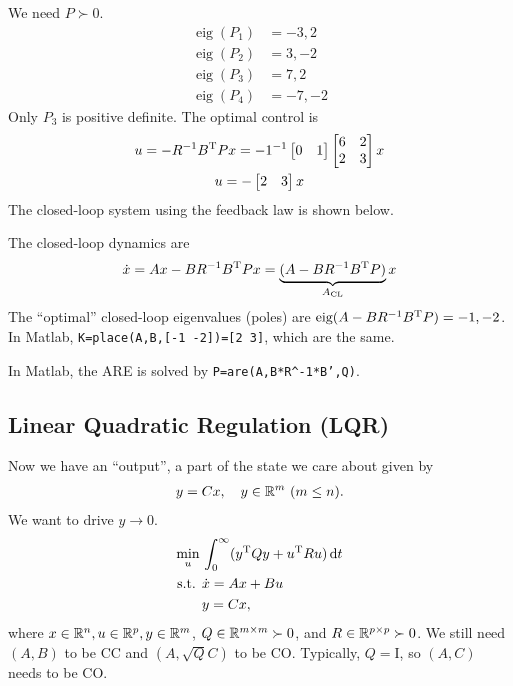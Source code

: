 We need $P\succ0$.
\begin{align}
  \mathop\text{eig}(P_1) &= -3,2 \\
  \mathop\text{eig}(P_2) &= 3,-2 \\
  \mathop\text{eig}(P_3) &= 7,2 \\
  \mathop\text{eig}(P_4) &= -7,-2
\end{align}
Only $P_3$ is positive definite. The optimal control is
\begin{gather}
  u = -R^{-1}B^\text{T} Px = -1^{-1} \begin{bmatrix}
    0 & 1
  \end{bmatrix} \begin{bmatrix}
    6 & 2 \\ 2 & 3
  \end{bmatrix} x \\
  u = - \begin{bmatrix}
    2 & 3
  \end{bmatrix} x
\end{gather}
The closed-loop system using the feedback law is shown below.
\begin{center}
\end{center}
The closed-loop dynamics are
\begin{gather}
  \dot x = Ax - BR^{-1}B^\text{T} Px = \underbrace{(A-BR^{-1}B^\text{T} P)}_{A_\text{CL}} x
\end{gather}
The ``optimal'' closed-loop eigenvalues (poles) are $\mathop\text{eig}(A-BR^{-1}B^\text{T} P)=-1,-2$. In Matlab, \texttt{K=place(A,B,[-1 -2])=[2 3]}, which are the same.

In Matlab, the ARE is solved by \texttt{P=are(A,B*R\^{}-1*B',Q)}.

\subsection{Linear Quadratic Regulation (LQR)}
Now we have an ``output'', a part of the state we care about given by
\begin{gather}
  y=Cx, \quad y\in\mathbb{R}^m\ (m\le n).
\end{gather}
We want to drive $y\to0$.
\begin{align}
  \min_u {} & \int_0^\infty (y^\text{T} Qy + u^\text{T} Ru) \mathop{}\!\mathrm{d} t \\
  \text{s.t. } & \dot x = Ax + Bu \\
            & y = Cx,
\end{align}
where $x\in\mathbb{R}^n,u\in\mathbb{R}^p,y\in\mathbb{R}^m$, $Q\in\mathbb{R}^{m\times m}\succ 0$, and $R\in\mathbb{R}^{p\times p}\succ 0$. We still need $(A,B)$ to be CC and $(A,\sqrt{Q}C)$ to be CO. Typically, $Q=\mathrm{I}$, so $(A,C)$ needs to be CO.


